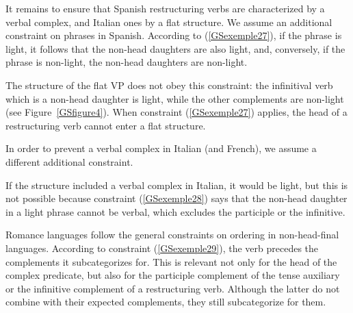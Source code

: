 {It remains to ensure that Spanish restructuring verbs are characterized by a verbal complex, and Italian ones by a flat structure. We assume an additional constraint on phrases in Spanish. According to (\ref{GSexemple27}), if the phrase is light, it follows that the non-head daughters are also light, and, conversely, if the phrase is non-light, the non-head daughters are non-light.

\begin{exe}
\end{exe}
The structure of the flat VP does not obey this constraint: the infinitival verb which is a non-head daughter is light, while the other complements are non-light (see Figure~\ref{GSfigure4}). When constraint (\ref{GSexemple27}) applies, the head of a restructuring verb cannot enter a flat structure. 

In order to prevent a verbal complex in Italian (and French), we assume a different additional constraint.

\begin{exe}
\end{exe}

If the structure included a verbal complex in Italian, it would be light, but this is not possible because constraint (\ref{GSexemple28}) says that the non-head daughter in a light phrase cannot be verbal, which excludes the participle or the infinitive.

Romance languages follow the general constraints on ordering in non-head-final languages. According to constraint (\ref{GSexemple29}), the verb precedes the complements it subcategorizes for. This is relevant not only for the head of the complex predicate, but also for the participle complement of the tense auxiliary or the infinitive complement of a restructuring verb. Although the latter do not combine with their expected complements, they still subcategorize for them.  

}
